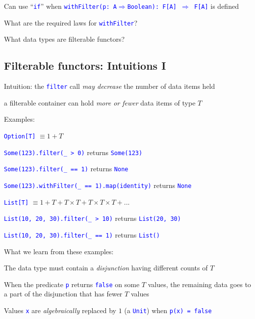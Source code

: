 Can use ``\texttt{\textcolor{blue}{\footnotesize{}if}}'' when \texttt{\textcolor{blue}{\footnotesize{}withFilter(p:\ A$\Rightarrow$Boolean):\ F{[}A{]}
$\Rightarrow$ F{[}A{]}}} is defined

What are the required laws for \texttt{\textcolor{blue}{\footnotesize{}withFilter}}?

What data types are filterable functors?


\subsection{Filterable functors: Intuitions I}

Intuition: the \texttt{\textcolor{blue}{\footnotesize{}filter}} call
\emph{may decrease} the number of data items held

a filterable container can hold \emph{more or fewer} data items of
type $T$

Examples:

\texttt{\textcolor{blue}{\footnotesize{}Option{[}T{]}}} $\equiv1+T$

\texttt{\textcolor{blue}{\footnotesize{}Some(123).filter(\_ > 0)}}
returns \texttt{\textcolor{blue}{\footnotesize{}Some(123)}} 

\texttt{\textcolor{blue}{\footnotesize{}Some(123).filter(\_ == 1)}}
returns \texttt{\textcolor{blue}{\footnotesize{}None}} 

\texttt{\textcolor{blue}{\footnotesize{}Some(123).withFilter(\_ ==
1).map(identity)}} returns \texttt{\textcolor{blue}{\footnotesize{}None}} 

\texttt{\textcolor{blue}{\footnotesize{}List{[}T{]}}} $\equiv1+T+T\times T+T\times T\times T+...$

\texttt{\textcolor{blue}{\footnotesize{}List(10, 20, 30).filter(\_
> 10)}} returns \texttt{\textcolor{blue}{\footnotesize{}List(20, 30)}} 

\texttt{\textcolor{blue}{\footnotesize{}List(10, 20, 30).filter(\_
== 1)}} returns \texttt{\textcolor{blue}{\footnotesize{}List()}} 

What we learn from these examples:

The data type must contain a \emph{disjunction} having different counts
of $T$

When the predicate \texttt{\textcolor{blue}{\footnotesize{}p}} returns
\texttt{\textcolor{blue}{\footnotesize{}false}} on some $T$ values,
the remaining data goes to a part of the disjunction that has fewer
$T$ values

Values \texttt{\textcolor{blue}{\footnotesize{}x}} are \emph{algebraically}
replaced by $1$ (a \texttt{\textcolor{blue}{\footnotesize{}Unit}})
when \texttt{\textcolor{blue}{\footnotesize{}p(x) = false}} 


